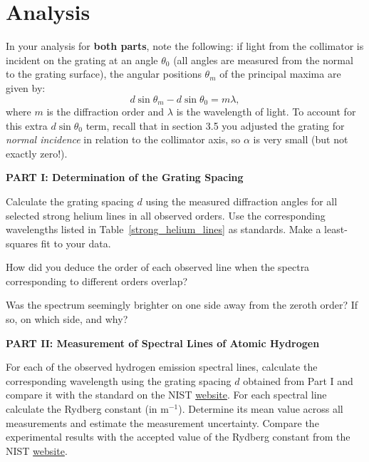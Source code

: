 \documentclass[12pt]{article}
\begin{document}
\newpage
\section{Analysis}

In your analysis for \textbf{both parts}, note the following: if light from the collimator is incident on the grating at an angle $\theta_0$ (all angles are measured from the normal to the grating surface), the angular positions $\theta_m$ of the principal maxima are given by:
\begin{equation*}
    d \sin \theta_m - d\sin\theta_0 = m\lambda,
\end{equation*}
where $m$ is the diffraction order and $\lambda$ is the wavelength of light. To account for this extra $d\sin \theta_0$ term, recall that in section 3.5 you adjusted the grating for \textit{normal incidence} in relation to the collimator axis, so $\alpha$ is very small (but not exactly zero!).

\vspace{0.25in}

\hfil \textbf{\large PART I: Determination of the Grating Spacing} \hfil
\vspace{0.1in}

Calculate the grating spacing $d$ using the measured diffraction angles for all selected strong helium lines in all observed orders. Use the corresponding wavelengths listed in Table~\ref{strong_helium_lines} as standards. Make a least-squares fit to your data.

How did you deduce the order of each observed line when the spectra corresponding to different orders overlap?

Was the spectrum seemingly brighter on one side away from the zeroth order? If so, on which side, and why?
\vspace{0.25in}

\hfil \textbf{\large PART II: Measurement of Spectral Lines of Atomic Hydrogen} \hfil
\vspace{0.1in}

For each of the observed hydrogen emission spectral lines, calculate the corresponding wavelength using the grating spacing $d$ obtained from Part I and compare it with the standard on the NIST \href{https://physics.nist.gov/PhysRefData/Handbook/Tables/hydrogentable2.htm}{website}. For each spectral line calculate the Rydberg constant (in m$^{-1}$). Determine its mean value across all measurements and estimate the measurement uncertainty. Compare the experimental results with the accepted value of the Rydberg constant from the NIST \href{https://physics.nist.gov/cgi-bin/cuu/Value?ryd}{website}.
\end{document}
